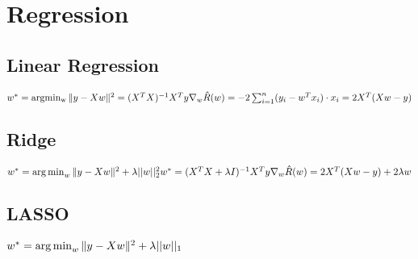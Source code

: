 \section*{Regression}
\subsection*{Linear Regression}
$w^* = \operatorname{argmin_w} \|y - Xw\|^2=(X^T X)^{-1} X^T y\\
\nabla_w \hat{R}(w) = -2 \sum_{i=1}^n (y_i-w^T x_i) \cdot x_i\\
= 2X^T (Xw-y)$


\subsection*{Ridge}
$w^*=\operatorname*{arg\,min}_w \|y - Xw\|^2 + \lambda ||w||_2^2\\
w^*=(X^T X + \lambda I)^{-1} X^T y\\
\nabla_w \hat{R}(w) = 2X^T (Xw-y) + 2\lambda w$

\subsection*{LASSO}
$w^*=\operatorname*{arg\,min}_w \|y - Xw\|^2 + \lambda ||w||_1$
\\